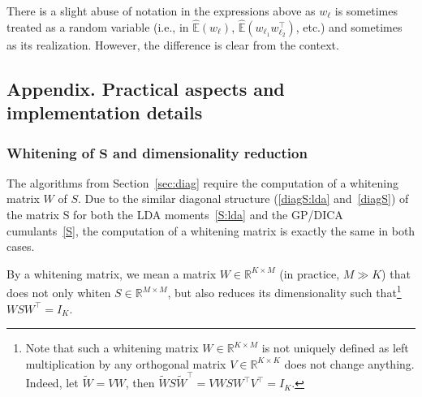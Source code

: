 \documentclass{article}
\newcommand{\wt}[1]{\widetilde{#1}}
\newcommand{\wh}[1]{\widehat{#1}}
\newcommand{\rr}[1]{\mathbb{R}^{#1}}
\newcommand{\ebb}{\mathbb{E}}
\newcommand{\webb}{\wh{\ebb}}
\begin{document}
There is a slight abuse of notation in the expressions above as $w_{\ell}$ is sometimes treated as a random variable (i.e., in $\webb(w_{\ell})$, $\webb(w_{\ell_1} w_{\ell_2}^{\top})$, etc.) and sometimes as its realization. However, the difference is clear from the context.


















































\subsection{Appendix. Practical aspects and implementation details} \label{sec:app:implementation}
\subsubsection{Whitening of $\mathbf{S}$ and dimensionality reduction}\label{sec:whitening}
The algorithms from Section~\ref{sec:diag} require the computation of a whitening matrix $W$ of $S$. Due to the similar diagonal structure (\eqref{diagS:lda} and~\eqref{diagS}) of the matrix S for both the LDA moments~\eqref{S:lda} and the GP/DICA cumulants~\eqref{S}, the computation of a whitening matrix is exactly the same in both cases. 

By a whitening matrix, we mean a matrix $W\in\rr{K\times M}$ (in practice, $M\gg K$) that does not only whiten $S\in\rr{M\times M}$, but also reduces its dimensionality such that\footnote{Note that such a whitening matrix $W\in\rr{K\times M}$ is not uniquely defined as left multiplication by any orthogonal matrix $V\in\rr{K\times K}$ does not change anything. Indeed, let $\wt{W} = VW$, then $\wt{W}S\wt{W}^{\top} = VWSW^{\top} V^{\top} = I_K$.} $WSW^{\top} = I_K$.
\end{document}
